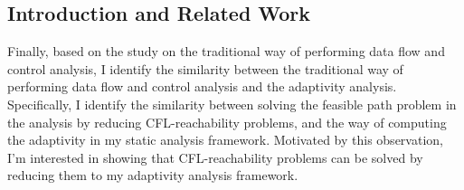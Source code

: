 \subsection{Introduction and Related Work}
\label{subsec:cfl-backgroung}
Finally, based on the study on the traditional way of performing data flow and control analysis,
 I identify the similarity between the traditional way of performing data flow and control analysis and the 
 adaptivity analysis. 
 Specifically, I identify the similarity between 
 solving the feasible path problem in the analysis by reducing CFL-reachability problems,
 and the way of computing the adaptivity in my static analysis framework.
 Motivated by this observation, 
 I'm interested in showing that
 CFL-reachability problems can be solved by reducing them to my adaptivity analysis framework.

